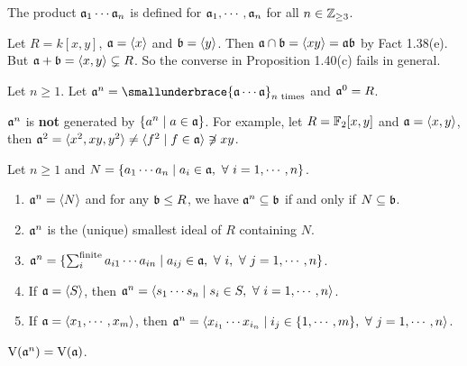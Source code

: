 \begin{remark}
    The product $\mathfrak{a}_1 \cdots \mathfrak{a}_n$ is defined for $\mathfrak{a}_1,\cdots,\mathfrak{a}_n$ for all $n \in \mathbb{Z}_{\geq 3}$.
\end{remark}

\begin{example}
    Let $R = k[x,y]$, $\mathfrak{a} = \langle x \rangle$ and $\mathfrak{b} = \langle y \rangle$. Then $\mathfrak{a} \cap \mathfrak{b} = \langle xy \rangle = \mathfrak{a} \mathfrak{b}$ by Fact 1.38(e). But $\mathfrak{a} + \mathfrak{b} = \langle x,y \rangle \subsetneq R$. So the converse in Proposition 1.40(c) fails in general.
\end{example}

\begin{definition}
    Let $n \geq 1$. Let $\ffa^n = \smallunderbrace{\ffa \cdots \ffa}_{n\text{ times}}$ and $\mathfrak{a}^0 = R$.
\end{definition}

\begin{warning}
    $\mathfrak{a}^n$ is \textbf{not} generated by $\{a^n \mid a \in \mathfrak{a}\}$. For example, let $R = \mathbb{F}_2[x,y]$ and $\mathfrak{a} = \langle x,y \rangle$, then $\mathfrak{a}^2 = \langle x^2,xy,y^2 \rangle \neq \langle f^2 \mid f \in \mathfrak{a} \rangle \not \ni xy$.
\end{warning}

\begin{fact}
    Let $n \geq 1$ and $N = \{a_1 \cdots a_n \mid a_i \in \mathfrak{a}, \ \forall \  i = 1,\cdots,n\}$.
    \begin{enumerate}
        \item
            $\mathfrak{a}^n = \langle N \rangle$ and for any $\mathfrak{b} \leq R$, we have $\mathfrak{a}^n \subseteq \mathfrak{b}$ if and only if $N \subseteq \mathfrak{b}$.
        \item 
            $\mathfrak{a}^n$ is the (unique) smallest ideal of $R$ containing $N$.
        \item $\mathfrak{a}^n = \{\sum_{i}^{\text{finite}}a_{i1} \cdots a_{in} \mid a_{ij} \in \mathfrak{a}, \ \forall \  i, \ \forall \  j = 1,\cdots,n\}$.
        \item If $\mathfrak{a} = \langle S \rangle$, then $\mathfrak{a}^n = \langle s_1 \cdots s_n \mid s_i \in S, \ \forall \  i = 1,\cdots,n\rangle$.
        \item 
            If $\mathfrak{a} = \langle x_1,\cdots,x_m \rangle$, then $\mathfrak{a}^n = \langle x_{i_1} \cdots x_{i_n} \mid i_j \in \{1,\cdots,m\}, \ \forall \  j = 1,\cdots,n \rangle$.
    \end{enumerate}
\end{fact}

\begin{fact}
    $\operatorname{V}(\mathfrak{a}^n) = \operatorname{V}(\mathfrak{a})$.
\end{fact}

